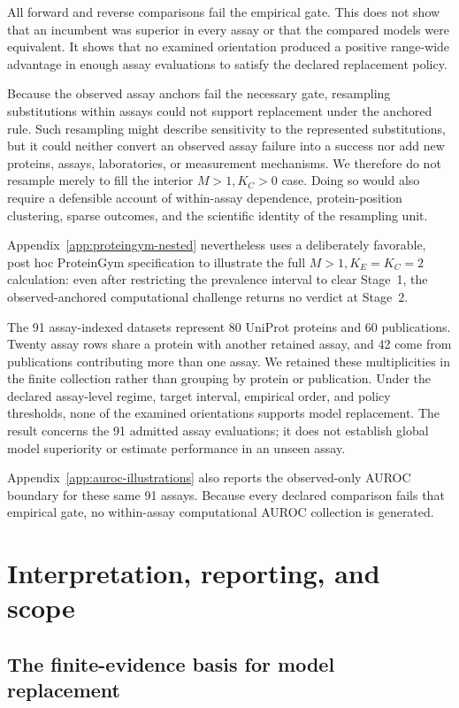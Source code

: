 \documentclass[11pt]{article}
\theoremstyle{remark}
\begin{document}
All forward and reverse comparisons fail the empirical gate. This does not show
that an incumbent was superior in every assay or that the compared models were
equivalent. It shows that no examined orientation produced a positive
range-wide advantage in enough assay evaluations to satisfy the declared
replacement policy.

Because the observed assay anchors fail the necessary gate, resampling
substitutions within assays could not support replacement under the anchored
rule. Such resampling might describe sensitivity to the represented
substitutions, but it could neither convert an observed assay failure into a
success nor add new proteins, assays, laboratories, or measurement mechanisms.
We therefore do not resample merely to fill the interior $M>1,K_C>0$ case.
Doing so would also require a defensible account of within-assay dependence,
protein-position clustering, sparse outcomes, and the scientific identity of
the resampling unit.

Appendix~\ref{app:proteingym-nested} nevertheless uses a deliberately
favorable, post hoc ProteinGym specification to illustrate the full
$M>1,K_E=K_C=2$ calculation: even after restricting the prevalence interval
to clear Stage~1, the observed-anchored computational challenge returns no
verdict at Stage~2.

The 91 assay-indexed datasets represent 80 UniProt proteins and 60
publications. Twenty assay rows share a protein with another retained assay,
and 42 come from publications contributing more than one assay. We retained
these multiplicities in the finite collection rather than grouping by protein
or publication. Under the declared assay-level regime, target interval,
empirical order, and policy thresholds, none of the examined orientations
supports model replacement. The result concerns the 91 admitted assay
evaluations; it does not establish global model superiority or estimate
performance in an unseen assay.

Appendix~\ref{app:auroc-illustrations} also reports the observed-only AUROC
boundary for these same 91 assays. Because every declared comparison fails
that empirical gate, no within-assay computational AUROC collection is
generated.


\section{Interpretation, reporting, and scope}
\label{sec:discussion}

\subsection{The finite-evidence basis for model replacement}
\end{document}
